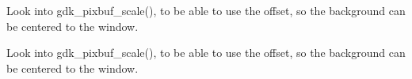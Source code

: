 
\begin{DoxyRefList}
\item[Member \mbox{\hyperlink{classHomeView_abf8f23ea55e466d0662fe632be476f89}{Home\+View::Draw\+Background\+Scaled}} (int width=0, int height=0)]\label{todo__todo000002}%
%
Look into gdk\+\_\+pixbuf\+\_\+scale(), to be able to use the offset, so the background can be centered to the window. 

\label{todo__todo000001}%
%
Look into gdk\+\_\+pixbuf\+\_\+scale(), to be able to use the offset, so the background can be centered to the window. 
\end{DoxyRefList}